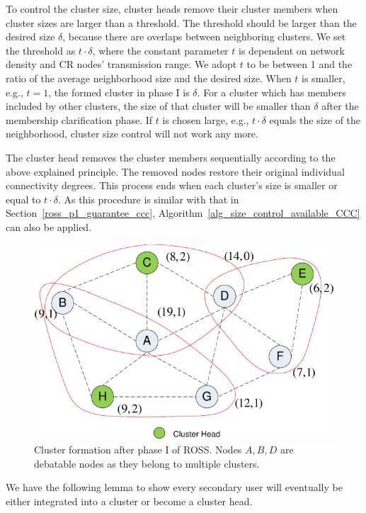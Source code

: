\documentclass[times]{ettauth}
\newcommand{\eg}{e.g., }
\theoremstyle{mytheoremstyle}
\theoremstyle{mytheoremstyle}
\theoremstyle{mytheoremstyle}
\begin{document}
To control the cluster size, cluster heads remove their cluster members when cluster sizes are larger than a threshold.
The threshold should be larger than the desired size $\delta$, because there are overlaps between neighboring clusters.
We set the threshold as $t\cdot \delta$, where the constant parameter $t$ is dependent on network density and CR nodes' transmission range.
We adopt $t$ to be between 1 and the ratio of the average neighborhood size and the desired size.
When $t$ is smaller, \eg $t=1$, the formed cluster in phase I is $\delta$.
For a cluster which has members included by other clusters, the size of that cluster will be smaller than $\delta$ after the membership clarification phase.
If $t$ is chosen large, \eg $t\cdot\delta$ equals the size of the neighborhood, cluster size control will not work any more.
	
The cluster head removes the cluster members sequentially according to the above explained principle.
The removed nodes restore their original individual connectivity degrees.
This process ends when each cluster's size is smaller or equal to $t \cdot\delta$.
As this procedure is similar with that in Section~\ref{ross_p1_guarantee_ccc}, Algorithm~\ref{alg_size_control_available_CCC} can also be applied.

\begin{figure}[ht!]
  \centering
  \includegraphics[width=0.5\linewidth]{figure2.pdf}
  \caption{Cluster formation after phase I of ROSS. Nodes $A, B, D$ are debatable nodes as they belong to multiple clusters.}
  \label{fig2}
\end{figure}


We have the following lemma to show every secondary user will eventually be either integrated into a cluster or become a cluster head.
\end{document}
